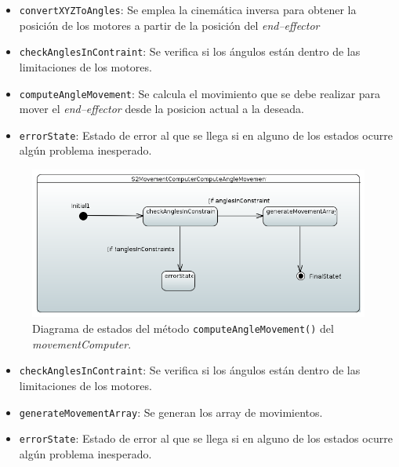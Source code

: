 \begin{itemize}
    \item \texttt{convertXYZToAngles}: Se emplea la cinemática inversa para obtener la posición de los motores a partir de la posición del \textit{end--effector}
    \item \texttt{checkAnglesInContraint}: Se verifica si los ángulos están dentro de las limitaciones de los motores.
    \item \texttt{computeAngleMovement}: Se calcula el movimiento que se debe realizar para mover el \textit{end--effector} desde la posicion actual a la deseada.
    \item \texttt{errorState}: Estado de error al que se llega si en alguno de los estados ocurre algún problema inesperado. 
\end{itemize}

\begin{figure}[H]
    \centering
    \includegraphics[width=1\linewidth]{pictures/S2MovementComputerComputeAngleMovement.PNG}
    \caption{Diagrama de estados del método \texttt{computeAngleMovement()} del \textit{movementComputer}.}
    \label{fig:fun_compute_angle_mocement_movement_computer}
\end{figure}

\begin{itemize}
    \item \texttt{checkAnglesInContraint}: Se verifica si los ángulos están dentro de las limitaciones de los motores.
    \item \texttt{generateMovementArray}: Se generan los array de movimientos.
    \item \texttt{errorState}: Estado de error al que se llega si en alguno de los estados ocurre algún problema inesperado. 
\end{itemize}